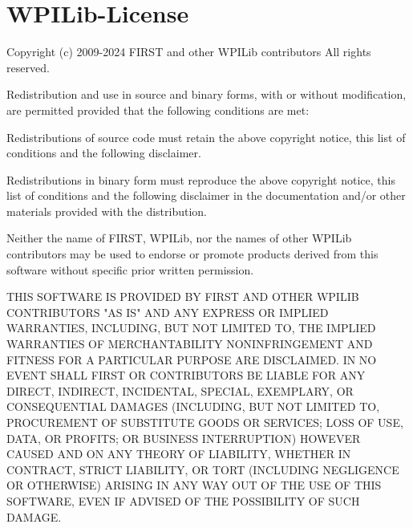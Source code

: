 \chapter{WPILib-\/\+License}
\hypertarget{md__smokey-18_2_w_p_i_lib-_license}{}\label{md__smokey-18_2_w_p_i_lib-_license}
Copyright (c) 2009-\/2024 FIRST and other WPILib contributors All rights reserved.

Redistribution and use in source and binary forms, with or without modification, are permitted provided that the following conditions are met\+:
\begin{DoxyItemize}
\item Redistributions of source code must retain the above copyright notice, this list of conditions and the following disclaimer.
\item Redistributions in binary form must reproduce the above copyright notice, this list of conditions and the following disclaimer in the documentation and/or other materials provided with the distribution.
\item Neither the name of FIRST, WPILib, nor the names of other WPILib contributors may be used to endorse or promote products derived from this software without specific prior written permission.
\end{DoxyItemize}

THIS SOFTWARE IS PROVIDED BY FIRST AND OTHER WPILIB CONTRIBUTORS "{}\+AS IS"{} AND ANY EXPRESS OR IMPLIED WARRANTIES, INCLUDING, BUT NOT LIMITED TO, THE IMPLIED WARRANTIES OF MERCHANTABILITY NONINFRINGEMENT AND FITNESS FOR A PARTICULAR PURPOSE ARE DISCLAIMED. IN NO EVENT SHALL FIRST OR CONTRIBUTORS BE LIABLE FOR ANY DIRECT, INDIRECT, INCIDENTAL, SPECIAL, EXEMPLARY, OR CONSEQUENTIAL DAMAGES (INCLUDING, BUT NOT LIMITED TO, PROCUREMENT OF SUBSTITUTE GOODS OR SERVICES; LOSS OF USE, DATA, OR PROFITS; OR BUSINESS INTERRUPTION) HOWEVER CAUSED AND ON ANY THEORY OF LIABILITY, WHETHER IN CONTRACT, STRICT LIABILITY, OR TORT (INCLUDING NEGLIGENCE OR OTHERWISE) ARISING IN ANY WAY OUT OF THE USE OF THIS SOFTWARE, EVEN IF ADVISED OF THE POSSIBILITY OF SUCH DAMAGE. 